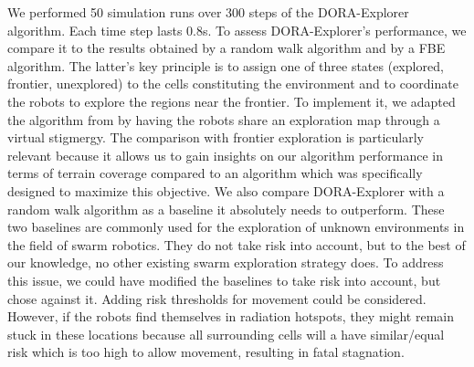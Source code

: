 



We performed 50 simulation runs over 300 steps of the DORA-Explorer
algorithm. Each time step lasts 0.8s. To assess DORA-Explorer's performance, we compare it to the results
obtained by a random walk algorithm and by a FBE algorithm. The
latter's key principle is to assign one of three states (explored,
frontier, unexplored) to the cells constituting the environment and to
coordinate the robots to explore the regions near the frontier. To
implement it, we adapted the algorithm from
\cite{yamauchi1998frontier} by having the robots share an exploration
map through a virtual stigmergy. The comparison with frontier exploration is
particularly relevant because it allows us to gain insights on our
algorithm performance in terms of terrain coverage compared to an
algorithm which was specifically designed to maximize this
objective. We also compare DORA-Explorer with a random walk algorithm as a
baseline it absolutely needs to outperform. These two baselines are
commonly used for the exploration of unknown environments in the field
of swarm robotics. They do not take risk into account, but to the best
of our knowledge, no other existing swarm exploration strategy does. To address this issue, we could have modified the baselines to take risk into account, but chose against it. Adding risk thresholds for movement could be considered. However, if the robots find themselves in radiation hotspots, they might remain stuck in these locations because all surrounding cells will a have similar/equal risk which is too high to allow movement, resulting in fatal stagnation. 


